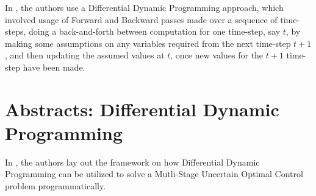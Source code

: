 In \cite{ddp_sugar_01}, the authors use a Differential Dynamic Programming approach, which involved usage of Forward and Backward passes made over a sequence of time-steps, doing a back-and-forth between computation for one time-step, say $t$, by making some assumptions on any variables required from the next time-step $t+1$, and then updating the assumed values at $t$, once new values for the $t+1$ time-step have been made.

\chapter{Abstracts: Differential Dynamic Programming}

In \cite{Qian2014Jul}, the authors lay out the framework on how Differential 
Dynamic Programming can be utilized to solve a Mutli-Stage Uncertain 
Optimal Control problem programmatically.




